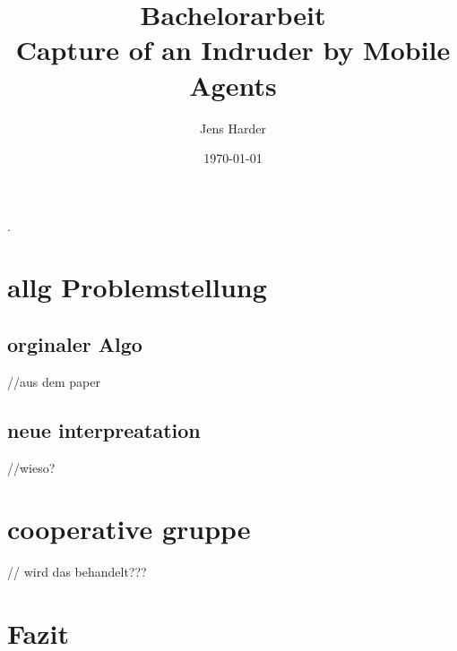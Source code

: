 \documentclass{article}
\title{Bachelorarbeit\\
	Capture of an Indruder by Mobile Agents}
\author{Jens Harder}
\date{\today}
\begin{document}
	\maketitle
	\newpage
	
	.
	\tableofcontents
	
	\newpage
	
	
	
	\section{allg Problemstellung}
	
	\subsection{orginaler Algo}
	//aus dem paper
	
	\subsection{neue interpreatation}
	//wieso?
	
	
	
	\section{cooperative gruppe}
	// wird das behandelt???
	
	\section{Fazit}
	
	
\end{document}
